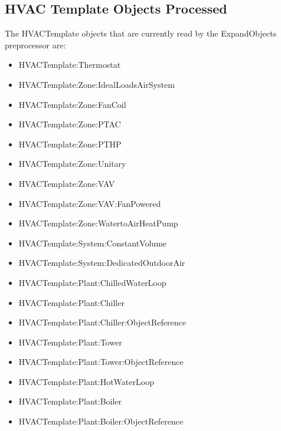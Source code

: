 \subsection{HVAC Template Objects Processed}\label{hvac-template-objects-processed}

The HVACTemplate objects that are currently read by the ExpandObjects preprocessor are:

\begin{itemize}
\item
  HVACTemplate:Thermostat
\item
  HVACTemplate:Zone:IdealLoadsAirSystem
\item
  HVACTemplate:Zone:FanCoil
\item
  HVACTemplate:Zone:PTAC
\item
  HVACTemplate:Zone:PTHP
\item
  HVACTemplate:Zone:Unitary
\item
  HVACTemplate:Zone:VAV
\item
  HVACTemplate:Zone:VAV:FanPowered
\item
  HVACTemplate:Zone:WatertoAirHeatPump
\item
  HVACTemplate:System:ConstantVolume
\item
  HVACTemplate:System:DedicatedOutdoorAir
\item
  HVACTemplate:Plant:ChilledWaterLoop
\item
  HVACTemplate:Plant:Chiller
\item
  HVACTemplate:Plant:Chiller:ObjectReference
\item
  HVACTemplate:Plant:Tower
\item
  HVACTemplate:Plant:Tower:ObjectReference
\item
  HVACTemplate:Plant:HotWaterLoop
\item
  HVACTemplate:Plant:Boiler
\item
  HVACTemplate:Plant:Boiler:ObjectReference
\end{itemize}